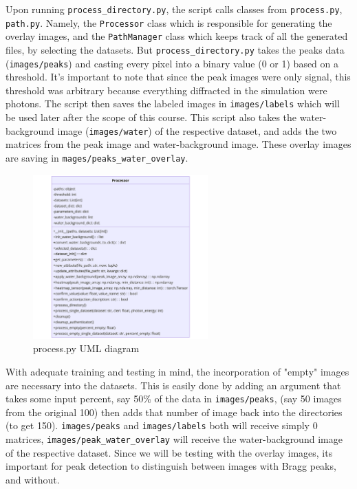 \documentclass[12pt]{article}
\begin{document}
Upon running \texttt{process\_directory.py}, the script calls classes from \texttt{process.py}, \texttt{path.py}. Namely, the \texttt{Processor} class which is responsible for generating the overlay images, and the \texttt{PathManager} class which keeps track of all the generated files, by selecting the datasets. But \texttt{process\_directory.py} takes the peaks data (\texttt{images/peaks}) and casting every pixel into a binary value (0 or 1) based on a threshold. It's important to note that since the peak images were only signal, this threshold was arbitrary because everything diffracted in the simulation were photons. The script then saves the labeled images in \texttt{images/labels} which will be used later after the scope of this course. This script also takes the water-background image (\texttt{images/water}) of the respective dataset, and adds the two matrices from the peak image and water-background image. These overlay images are saving in \texttt{mages/peaks\_water\_overlay}.\\

\begin{figure}[H]
    \centering
    \includegraphics[width=0.6\textwidth]{uml_diagrams/process_uml.png}
    \caption{process.py UML diagram}
    \label{fig:process}
\end{figure}

With adequate training and testing in mind, the incorporation of "empty" images are necessary into the datasets. This is easily done by adding an argument that takes some input percent, say 50\% of the data in \texttt{images/peaks}, (say 50 images from the original 100) then adds that number of image back into the directories (to get 150). \texttt{images/peaks} and \texttt{images/labels} both will receive simply 0 matrices, \texttt{images/peak\_water\_overlay} will receive the water-background image of the respective dataset. Since we will be testing with the overlay images, its important for peak detection to distinguish between images with Bragg peaks, and without.\\
\end{document}
